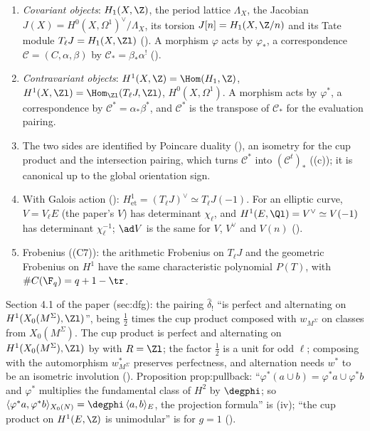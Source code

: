 \begin{convention}\label{conv:curves:duality}
\leavevmode
\begin{enumerate}[label=(\alph*)]
\item \emph{Covariant objects}: $H_1(X,\Z)$, the period lattice $\Lambda_X$, the Jacobian $J(X)=H^0(X,\Omega^1)^\vee/\Lambda_X$, its torsion $J[n]=H_1(X,\Z/n)$ and its Tate module
$T_\ell J=H_1(X,\Zl)$ (). A morphism $\varphi$ acts by $\varphi_*$, a correspondence $\mathcal C=(C,\alpha,\beta)$ by $\mathcal C_*=\beta_*\alpha^!$
().
\item \emph{Contravariant objects}: $H^1(X,\Z)=\Hom(H_1,\Z)$, $H^1(X,\Zl)=\Hom_{\Zl}(T_\ell J,\Zl)$, $H^0(X,\Omega^1)$. A morphism acts by $\varphi^*$, a correspondence by
$\mathcal C^*=\alpha_*\beta^*$, and $\mathcal C^*$ is the transpose of $\mathcal C_*$ for the evaluation pairing.
\item The two sides are identified by Poincare duality (), an isometry for the cup product and the intersection pairing, which turns $\mathcal C^*$ into
$(\mathcal C^t)_*$ ((c)); it is canonical up to the global orientation sign.
\item With Galois action (): $H^1_{\mathrm{et}}=(T_\ell J)^\vee\simeq T_\ell J(-1)$. For an elliptic curve, $V=V_\ell E$ (the paper's $V$) has determinant
$\chi_\ell$, and $H^1(E,\Ql)=V^\vee\simeq V(-1)$ has determinant $\chi_\ell^{-1}$; $\ad V$ is the same for $V$, $V^\vee$ and $V(n)$ ().
\item Frobenius ((C7)): the arithmetic Frobenius on $T_\ell J$ and the geometric Frobenius on $H^1$ have the same characteristic polynomial $P(T)$,
with $\#C(\F_q)=q+1-\tr$.
\end{enumerate}
\end{convention}

\begin{paperlink}\label{pl:curves:cup}
Section 4.1 of the paper (sec:dfg): the pairing $\hat\delta_!$ ``is perfect and alternating on $H^1(X_0(M^\Sigma),\Zl)$'', being $\frac12$ times the cup product composed with
$w_{M^\Sigma}$ on classes from $X_0(M^\Sigma)$. The cup product is perfect and alternating on $H^1(X_0(M^\Sigma),\Zl)$ by  with $R=\Zl$; the factor $\frac12$
is a unit for odd $\ell$; composing with the automorphism $w_{M^\Sigma}^*$ preserves perfectness, and alternation needs $w^*$ to be an isometric involution
(). Proposition prop:pullback: ``$\varphi^*(a\cup b)=\varphi^*a\cup\varphi^*b$ and $\varphi^*$ multiplies the fundamental class of $H^2$ by $\degphi$; so
$\langle\varphi^*a,\varphi^*b\rangle_{X_0(N)}=\degphi\,\langle a,b\rangle_E$, the projection formula'' is (iv); ``the cup product on $H^1(E,\Z)$ is unimodular''
is  for $g=1$ ().
\end{paperlink}

